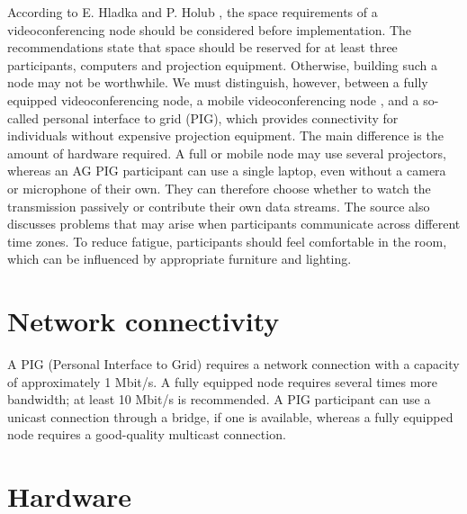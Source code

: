 According to E. Hladka and P. Holub \cite{ArticleUVTMU-KomunikaceAGPoint}, the space requirements of a videoconferencing node should be considered before implementation. The recommendations \cite{AG-MinimumReqirements} state that space should be reserved for at least three participants, computers and projection equipment. Otherwise, building such a node may not be worthwhile. We must distinguish, however, between a fully equipped videoconferencing node, a mobile videoconferencing node \cite{ArticleUVTMU-MobilniUzelAG}, and a so-called personal interface to grid (PIG), which provides connectivity for individuals without expensive projection equipment. The main difference is the amount of hardware required. A full or mobile node may use several projectors, whereas an AG PIG participant can use a single laptop, even without a camera or microphone of their own. They can therefore choose whether to watch the transmission passively or contribute their own data streams. The source also discusses problems that may arise when participants communicate across different time zones. To reduce fatigue, participants should feel comfortable in the room, which can be influenced by appropriate furniture and lighting.

\section{Network connectivity}

A PIG (Personal Interface to Grid) requires a network connection with a capacity of approximately 1 Mbit/s. A fully equipped node requires several times more bandwidth; at least 10 Mbit/s is recommended. A PIG participant can use a unicast connection through a bridge, if one is available, whereas a fully equipped node requires a good-quality multicast connection.

\section{Hardware}

